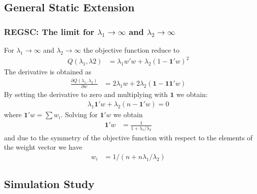 \newpage
\subsection{General Static Extension}
\subsubsection{REGSC: The limit for $\lambda_1\to \infty$ and $\lambda_2 \to \infty$}

For $\lambda_1\to \infty$ and $\lambda_2\to \infty$ the objective function reduce to
\begin{align*}
	Q(\lambda_1,\lambda2) &= \lambda_1 w'w + \lambda_2 (1-\mathbf{1}'w)^2
\end{align*}
The derivative is obtained as
\begin{align*}
	\frac{ \partial Q(\lambda_1,\lambda_2) }{ \partial w} &= 2 \lambda_1 w + 2 \lambda_2 (\mathbf{1}-\mathbf{1} \mathbf{1}'w)
\end{align*}
By setting the derivative to zero and multiplying with $\mathbf{1}$ we obtain:
\begin{align*}
	\lambda_1 \mathbf{1}'w + \lambda_2 (n- \mathbf{1}'w) = 0
\end{align*}
where $\mathbf{1}'w =\sum w_i$. Solving for $ \mathbf{1}'w $ we obtain
\begin{align*}
	\mathbf{1}'w  &= \frac{ 1}{ 1 +\lambda_1/\lambda_2 }
\end{align*}
and due to the symmetry of the objective function with respect to the elements of the weight vector we have
\begin{align*}
	w_i &= 1/(n+n\lambda_1/\lambda_2)
\end{align*}


\subsection{Simulation Study}
